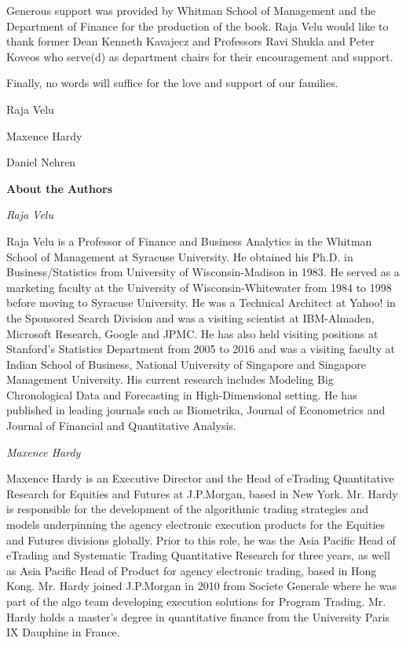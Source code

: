 Generous support was provided by Whitman School of Management and the Department of Finance for the production of the book. Raja Velu would like to thank former Dean Kenneth Kavajecz and Professors Ravi Shukla and Peter Koveos who serve(d) as department chairs for their encouragement and support.


Finally, no words will suffice for the love and support of our families. \vspace{3\baselineskip}


\noindent Raja Velu \par
\noindent Maxence Hardy \par
\noindent Daniel Nehren



\newpage



{\noindent\Large\bfseries About the Authors} \vspace{1cm}


{\noindent\large\itshape Raja Velu} \medskip

\noindent Raja Velu is a Professor of Finance and Business Analytics in the Whitman School of Management at Syracuse University. He obtained his Ph.D. in Business/Statistics from University of Wisconsin-Madison in 1983. He served as a marketing faculty at the University of Wisconsin-Whitewater from 1984 to 1998 before moving to Syracuse University. He was a Technical Architect at Yahoo! in the Sponsored Search Division and was a visiting scientist at IBM-Almaden, Microsoft Research, Google and JPMC. He has also held visiting positions at Stanford's Statistics Department from 2005 to 2016 and was a visiting faculty at Indian School of Business, National University of Singapore and Singapore Management University. His current research includes Modeling Big Chronological Data and Forecasting in High-Dimensional setting. He has published in leading journals such as Biometrika, Journal of Econometrics and Journal of Financial and Quantitative Analysis. \bigskip


{\noindent\large\itshape Maxence Hardy} \medskip

\noindent Maxence Hardy is an Executive Director and the Head of eTrading Quantitative Research for Equities and Futures at J.P.Morgan, based in New York. Mr. Hardy is responsible for the development of the algorithmic trading strategies and models underpinning the agency electronic execution products for the Equities and Futures divisions globally. Prior to this role, he was the Asia Pacific Head of eTrading and Systematic Trading Quantitative Research for three years, as well as Asia Pacific Head of Product for agency electronic trading, based in Hong Kong. Mr. Hardy joined J.P.Morgan in 2010 from Societe Generale where he was part of the algo team developing execution solutions for Program Trading. Mr. Hardy holds a master's degree in quantitative finance from the University Paris IX Dauphine in France. \bigskip


